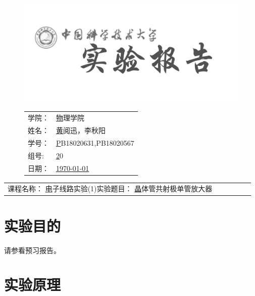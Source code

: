 \documentclass[a4paper,11pt,UTF8]{ctexart}
\newcommand{\major}{物理学院}
\newcommand{\name}{黄阅迅，李秋阳}
\newcommand{\stuid}{PB18020631,PB18020567}
\newcommand{\group}{20}
\newcommand{\newdate}{\today}
\newcommand{\course}{电子线路实验(1)}
\newcommand{\newtitle}{晶体管共射极单管放大器}
\begin{document}
\thispagestyle{empty}
\begin{figure}[h]
  \begin{minipage}{0.6\linewidth}
    \centerline{\includegraphics[width=\linewidth]{logo.png}}
  \end{minipage}
  \hfill
  \begin{minipage}{.4\linewidth}
    \raggedleft
    \begin{tabular*}{.8\linewidth}{ll}
      学院： & \underline\major   \\
      姓名： & \underline\name    \\
      学号： & \underline\stuid   \\
      组号:  & \underline\group   \\
      日期： & \underline\newdate \\
    \end{tabular*}
  \end{minipage}
\end{figure}

\begin{table}[!htbp]
  \centering
  \begin{tabular*}{\linewidth}{llllll}
    课程名称：  \underline\course   \qquad\qquad 实验题目：  \underline\newtitle  
  \end{tabular*}
\end{table}


\section{实验目的}

请参看预习报告。

\section{实验原理}
\end{document}
